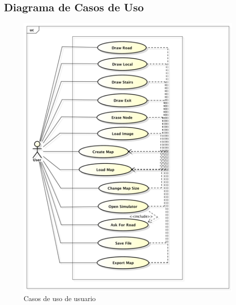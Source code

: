\documentclass[11pt]{book}
\begin{document}
\subsection{Diagrama de Casos de Uso}
\begin{figure}[H]
  \centering
    \includegraphics[scale=0.54]{diagrama_casos_uso}
  \caption{Casos de uso de usuario}
\end{figure}
\end{document}

